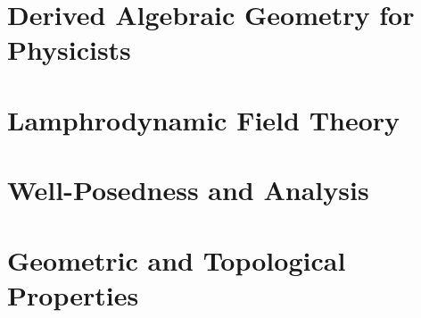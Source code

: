 \documentclass[11pt]{book}
\begin{document}
\mainmatter

\part{Derived Algebraic Geometry for Physicists}






\part{Lamphrodynamic Field Theory}






\part{Well-Posedness and Analysis}





\part{Geometric and Topological Properties}





\appendix







\backmatter
\printbibliography
\end{document}

